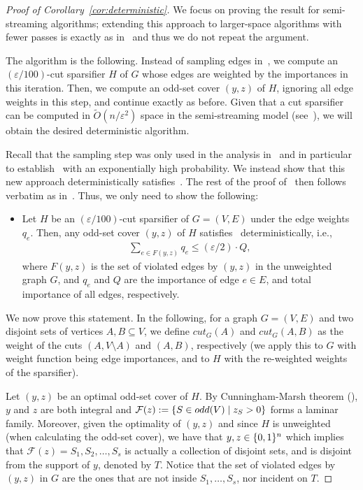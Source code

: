 \documentclass{theoretics}
\renewcommand{\leq}{\leqslant}
\DeclarePairedDelimiter{\set}{\{}{\}}
\newcommand{\Ot}{\widetilde{O}}
\newcommand{\eps}{\varepsilon}
\begin{document}
\begin{proof}[Proof of Corollary~\ref{cor:deterministic}]
	We focus on proving the result for semi-streaming algorithms; extending this approach to larger-space algorithms with fewer passes is exactly as in~ and thus we do not repeat the argument. 
	
	The algorithm is the following. Instead of sampling edges in~, we compute an $(\eps/100)$-cut sparsifier $H$ of $G$ whose edges are weighted by the importances in this iteration. 
Then, we compute an odd-set cover $(y,z)$ of $H$, ignoring all edge weights in this step, and continue exactly as before. Given that a cut sparsifier can be computed in $\Ot(n/\eps^2)$ space in the semi-streaming model (see~\cite{McGregor14}), 
we will obtain the desired deterministic algorithm. 

Recall that the sampling step was only used in the analysis in~ and in particular to establish~ with an exponentially high probability. We instead show that this new approach
deterministically satisfies~. The rest of the proof of~ then follows verbatim as in~. Thus, 
we only need to show the following: 
\begin{itemize}
	\item Let $H$ be an $(\eps/100)$-cut sparsifier of $G=(V,E)$ under the edge weights $q_e$. Then, any odd-set cover $(y,z)$ of $H$ satisfies~ deterministically, i.e., 
	\begin{align}
		\sum_{e \in F(y,z)} q_e \leq (\eps/2) \cdot Q, \label{eq:not-hold}
	\end{align}
	where $F(y,z)$ is the set of violated edges by $(y,z)$ in the unweighted graph $G$, and $q_e$ and $Q$ are the importance of edge $e \in E$, and total importance of all edges, respectively. 
\end{itemize}
We now prove this statement. 
In the following, for a graph $G=(V,E)$ and two disjoint sets of vertices $A,B \subseteq V$, we define $cut_G(A)$ and $cut_G(A,B)$ 
as the weight of the cuts $(A, V \setminus A)$ and $(A,B)$, respectively (we apply this to $G$ with weight function being edge importances, and to $H$ with the re-weighted weights of the sparsifier).  

Let $(y,z)$ be an optimal odd-set cover of $H$. By Cunningham-Marsh theorem (), 
$y$ and $z$ are both integral and $\mathcal{F}(z) := \set{S \in odd(V) \mid z_S > 0}$ forms a laminar family. Moreover, given the optimality of $(y,z)$ and since $H$ is unweighted (when calculating the odd-set cover), 
we have that $y,z \in \set{0,1}^n$ which implies that $\mathcal{F}(z) = S_1,S_2,\ldots,S_s$ is actually a collection of disjoint sets, and is disjoint from the support of $y$, denoted by $T$. 
Notice that the set of violated edges by $(y,z)$ in $G$ are the ones
that are not inside $S_1,\ldots,S_s$, nor incident on $T$. 


\end{proof}
\end{document}
